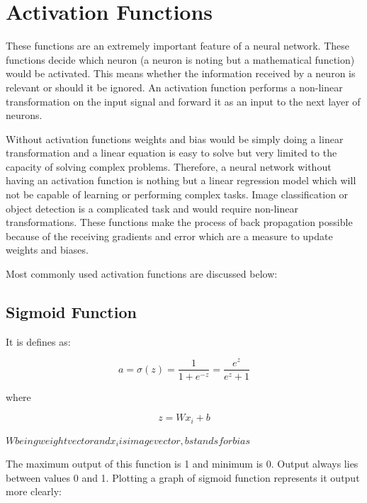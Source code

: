 \documentclass[11pt]{article}
\begin{document}
\section{Activation Functions}
These functions are an extremely important feature of a neural network. These functions decide which neuron (a neuron is noting but a mathematical function) would be activated. This means whether the information received by a neuron is relevant or should it be ignored. An activation function performs a non-linear transformation on the input signal and forward it as an input to the next layer of neurons.

Without activation functions weights and bias would be simply doing a linear transformation and a linear equation is easy to solve but very limited to the capacity of solving complex problems. Therefore, a neural network without having an activation function is nothing but a linear regression model which will not be capable of learning or performing complex tasks. Image classification or object detection is a complicated task and would require non-linear transformations. These functions make the process of back propagation possible because of the receiving gradients and error which are a measure to update weights and biases.

Most commonly used activation functions are discussed below:

\subsection{Sigmoid Function}
It is defines as:

\begin{equation}
a = \sigma(z) = \frac{1}{1+e^{-z}}=\frac{e^{z}}{e^{z}+1}
\end{equation}

where

\begin{equation}
z = Wx_i + b
\end{equation}

$W being weight vector and x_i is image vector, b stands for bias$


The maximum output of this function is 1 and minimum is 0. Output always lies between values 0 and 1. Plotting a graph of sigmoid function represents it output more clearly:
\end{document}
